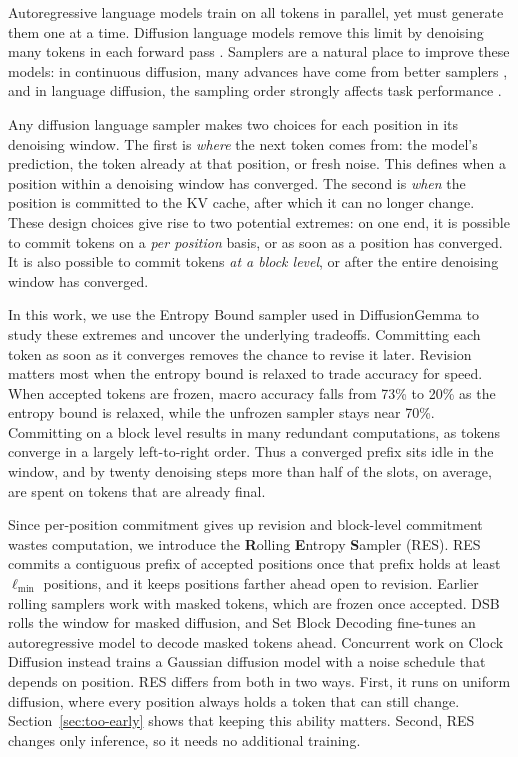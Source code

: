 Autoregressive language models train on all tokens in parallel, yet must generate them one at a time.
Diffusion language models remove this limit by denoising many tokens in each forward pass \citep{nie2026large, ye2025dream7bdiffusionlarge, team2026diffusiongemma}.
Samplers are a natural place to improve these models: in continuous diffusion, many advances have come from better samplers \citep{song2020denoising}, and in language diffusion, the sampling order strongly affects task performance \citep{kim2025train, ben2026accelerated, kim2026klass}.

Any diffusion language sampler makes two choices for each position in its denoising window.
The first is \emph{where} the next token comes from: the model's prediction, the token already at that position, or fresh noise.
This defines when a position within a denoising window has converged.
The second is \emph{when} the position is committed to the KV cache, after which it can no longer change.
These design choices give rise to two potential extremes: on one end, it is possible to commit tokens on a \textit{per position} basis, or as soon as a position has converged.
It is also possible to commit tokens \textit{at a block level}, or after the entire denoising window has converged.

In this work, we use the Entropy Bound sampler used in DiffusionGemma \citep{team2026diffusiongemma} to study these extremes and uncover the underlying tradeoffs.
Committing each token as soon as it converges removes the chance to revise it later.
Revision matters most when the entropy bound is relaxed to trade accuracy for speed.
When accepted tokens are frozen, macro accuracy falls from 73\% to 20\% as the entropy bound is relaxed, while the unfrozen sampler stays near 70\%.
Committing on a block level results in many redundant computations, as tokens converge in a largely left-to-right order.
Thus a converged prefix sits idle in the window, and by twenty denoising steps more than half of the slots, on average, are spent on tokens that are already final.

Since per-position commitment gives up revision and block-level commitment wastes computation, we introduce the \textbf{R}olling \textbf{E}ntropy \textbf{S}ampler (RES).
RES commits a contiguous prefix of accepted positions once that prefix holds at least $\ell_{\min}$ positions, and it keeps positions farther ahead open to revision.
Earlier rolling samplers work with masked tokens, which are frozen once accepted.
DSB \citep{luo2026dsb} rolls the window for masked diffusion, and Set Block Decoding \citep{gat2025set} fine-tunes an autoregressive model to decode masked tokens ahead.
Concurrent work on Clock Diffusion \citep{schiff2026clock} instead trains a Gaussian diffusion model with a noise schedule that depends on position.
RES differs from both in two ways.
First, it runs on uniform diffusion, where every position always holds a token that can still change. Section~\ref{sec:too-early} shows that keeping this ability matters.
Second, RES changes only inference, so it needs no additional training.

